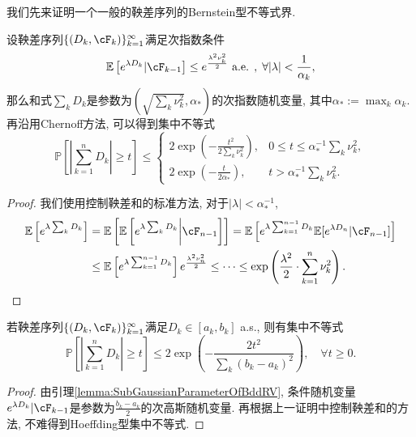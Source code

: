 我们先来证明一个一般的鞅差序列的Bernstein型不等式界. 
\begin{lemma}[Azuma]
	设鞅差序列$\{(D_k, \cF_k)\}_{k=1}^{\infty}$满足次指数条件
	\begin{equation*}
		\mathbb{E}\left[ e^{\lambda D_k} | \cF_{k-1} \right] 
		\leq e^{\frac{\lambda^2 \nu_k^2}{2}} \text{ a.e. },\; \forall |\lambda| < \frac{1}{\alpha_k}, 
	\end{equation*}
	那么和式$\sum_k D_k$是参数为$\left( \sqrt{\sum_k \nu_k^2}, \alpha_* \right)$的次指数随机变量, 其中$\alpha_* := \max_k \alpha_k$.  
	再沿用Chernoff方法, 可以得到集中不等式
	\begin{equation*}
		\mathbb{P} \left[ \left| \sum_{k=1}^n D_k \right| \geq t \right] \leq 
		\begin{cases}
			2 \exp\left( -\frac{t^2}{2 \sum_k \nu_k^2} \right), & 0 \leq t \leq \alpha_*^{-1} \sum_k \nu_k^2, \\
			2 \exp\left(- \frac{t}{2 \alpha_*}\right), & t > \alpha_*^{-1} \sum_k \nu_k^2.
		\end{cases}
	\end{equation*}
\end{lemma}
\begin{proof}
	我们使用控制鞅差和的标准方法, 对于$|\lambda| < \alpha_*^{-1}$, 
	\begin{align*}
		\mathbb{E}\left[ e^{\lambda \sum_k D_k} \right]
		&= \mathbb{E}\left[ \mathbb{E}\left[ e^{\lambda \sum_k D_k} \bigg| \cF_{n-1} \right] \right] 
		= \mathbb{E}\left[ e^{\lambda \sum_{k=1}^{n-1} D_k} \mathbb{E}[e^{\lambda D_n} | \cF_{n-1}] \right] \\
		&\leq \mathbb{E}\left[ e^{\lambda \sum_{k=1}^{n-1} D_k} \right]  e^{\frac{\lambda^2 \nu_n^2}{2}} 
		\leq \dots
		\leq \exp\left(\frac{\lambda^2}{2} \cdot  \sum_{k=1}^n \nu_k^2 \right).
	\end{align*}
\end{proof} 

\begin{theorem}\label{thm:Azuma–Hoeffding}
	若鞅差序列$\{(D_k, \cF_k)\}_{k=1}^{\infty}$满足$D_k \in [a_k, b_k]$ a.s., 则有集中不等式
	\begin{equation*}
		\mathbb{P} \left[ \left| \sum_{k=1}^n D_k \right| \geq t \right]
		\leq 2 \exp \left(- \frac{2 t^2}{\sum_k (b_k - a_k)^2} \right), 
		\quad \forall t \geq 0. 
	\end{equation*}	
\end{theorem}
\begin{proof}
	由引理\ref{lemma:SubGaussianParameterOfBddRV}, 条件随机变量$e^{\lambda D_k} | \cF_{k-1}$是参数为$\frac{b_k - a_k}{2}$的次高斯随机变量. 
	再根据上一证明中控制鞅差和的方法, 不难得到Hoeffding型集中不等式. 
\end{proof}

